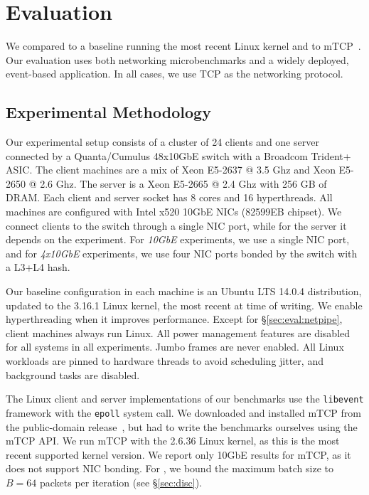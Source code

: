 
\section{Evaluation}
\label{sec:eval}


We compared \ix to a baseline running the most recent Linux kernel and
to mTCP~\cite{jeong2014mtcp}. Our evaluation uses both networking
microbenchmarks and a widely deployed, event-based application. In all
cases, we use TCP as the networking protocol.

\subsection{Experimental Methodology}
\label{sec:eval:setup}



Our experimental setup consists of a cluster of 24 clients and one
server connected by a Quanta/Cumulus 48x10GbE switch with a Broadcom
Trident+ ASIC.  The client machines are a mix of Xeon E5-2637 @ 3.5
Ghz and Xeon E5-2650 @ 2.6 Ghz. The server is a Xeon E5-2665 @ 2.4 Ghz
with 256 GB of DRAM.  Each client and server socket has 8 cores and 16
hyperthreads. All machines are configured with Intel x520 10GbE NICs
(82599EB chipset). We connect clients to the switch through a single
NIC port, while for the server it depends on the experiment. For
\emph{10GbE} experiments, we use a single NIC port, and for
\emph{4x10GbE} experiments, we use four NIC ports bonded by the switch
with a L3+L4 hash.

Our baseline configuration in each
machine is an Ubuntu LTS 14.0.4 distribution, updated to the 3.16.1 Linux kernel, the most
recent at time of writing.
We enable hyperthreading when it improves performance. Except for
\S\ref{sec:eval:netpipe}, client machines always run Linux. All power
management features are disabled for all systems in all
experiments. Jumbo frames are never enabled. All Linux workloads
are pinned to hardware threads to avoid scheduling jitter, and
background tasks are disabled.

 

The Linux client and server implementations of our benchmarks use the
\texttt{libevent} framework with the \texttt{epoll} system call.  We
downloaded and installed mTCP from the public-domain
release~\cite{url:mtcp}, but had to write the benchmarks ourselves
using the mTCP API.  We run mTCP with the 2.6.36 Linux kernel, as this
is the most recent supported kernel version.  We report only 10GbE
results for mTCP, as it does not support NIC bonding. For \ix, we
bound the maximum batch size to $B=64$ packets per iteration (see
\S\ref{sec:disc}).



